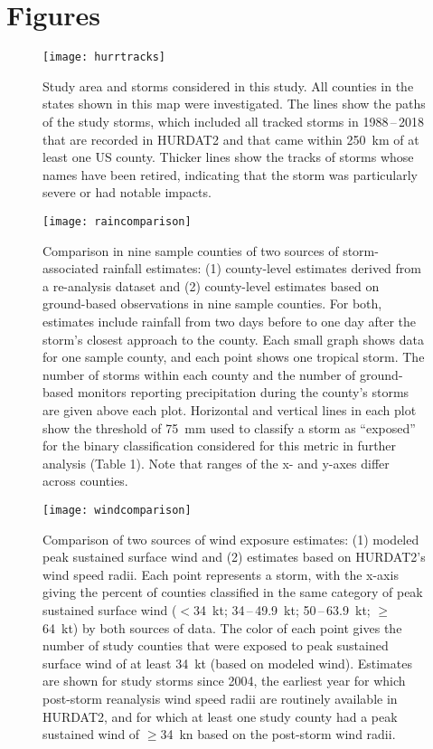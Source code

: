 \section*{Figures}

\listoffigures

\clearpage

\begin{figure}[tbhp!] \centering
\texttt{[image: hurrtracks]}
\caption{Study area and storms considered in this study. All counties in the states
	shown in this map were investigated. The lines show the paths of the
	study storms, which included all tracked storms in 1988\,--\,2018 that
	are recorded in \ac{HURDAT2} and that came
	within 250~\si{\kilo\metre} of at least one \ac{US} county. Thicker
	lines show the tracks of storms whose names have been retired,
	indicating that the storm was particularly severe or had notable
	impacts.  }
\label{fig:hurrtracks}
\end{figure}

\clearpage

\begin{figure}[tbhp!] \centering
\texttt{[image: raincomparison]} 
	\caption{Comparison in nine sample counties of two sources of storm-associated 
	rainfall estimates: (1) county-level estimates derived from 
	a re-analysis dataset and (2) county-level estimates based on ground-based
	observations in nine sample counties. For both, estimates  
	include rainfall from two days before to one day after the storm's closest
	approach to the county. Each small graph shows data for one sample county, 
	and each point shows one tropical storm. The number of storms 
	within each county and the number of ground-based monitors reporting precipitation during 
	the county's storms are given above each plot. Horizontal and vertical lines 
	in each plot show the threshold of 75~\si{\milli\metre} used to classify a storm 
	as ``exposed'' for the binary classification considered for this metric 
	in further analysis (Table 1). Note that 
	ranges of the x- and y-axes differ across counties.
	} 
\label{fig:raincomparison}
\end{figure}

\begin{figure}[tbhp!]
\centering
\texttt{[image: windcomparison]}
	\caption{Comparison of two sources of wind exposure estimates: 
	(1) modeled peak sustained surface wind 
	and (2) estimates based on \ac{HURDAT2}'s wind speed radii.
	Each point represents a storm, with the x-axis giving the percent of
	counties classified in the same category of peak sustained surface
	wind ($<$34~kt; 34\,--\,49.9~kt;
	50\,--\,63.9~kt; $\ge$64~kt) by both sources of 
	data. The color of each point gives the number of study counties that were exposed to
	peak sustained surface wind of at least 34~kt (based
	on modeled wind). Estimates are shown for study storms since
	2004, the earliest year for which post-storm reanalysis wind speed
	radii are routinely available in \ac{HURDAT2}, and for which at
	least one study county had a peak sustained wind of $\ge$34~\si{\knot}
	based on the post-storm wind radii.
	}
\label{fig:windcomparison}
\end{figure}

